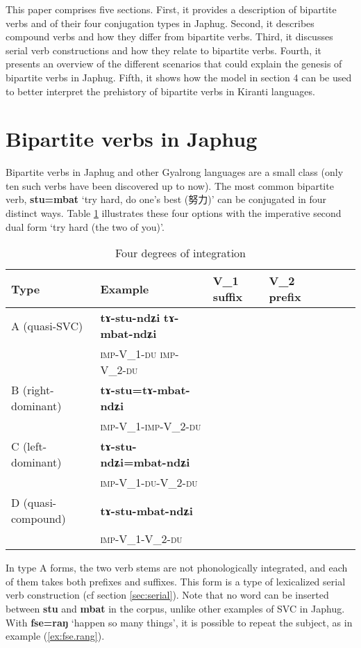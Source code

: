 \documentclass[11pt]{article}
\newcommand{\ipa}[1]{{\phon\textbf{#1}}}
\newcommand{\zh}[1]{{\cn #1}}
\newcommand{\Y}{\Checkmark}
\newcommand{\N}{}
\newcommand{\jpg}[2]{\ipa{#1} `#2'}
\newcommand{\refb}[1]{(\ref{#1})}
\begin{document}
This paper comprises five sections. First, it provides a description of bipartite verbs and of their four conjugation types in Japhug. Second, it describes compound verbs and how they differ from bipartite verbs. Third, it discusses serial verb constructions and how they relate to bipartite verbs. Fourth, it presents an overview of the different scenarios that could explain the genesis of bipartite verbs in Japhug. Fifth, it shows how the model in section 4 can be used to better interpret the prehistory of bipartite verbs in Kiranti languages.

\section{Bipartite verbs in Japhug} \label{sec:japhug.bipart}

Bipartite verbs in Japhug and other Gyalrong languages are a small class (only ten such verbs have been discovered up to now). 
The most common bipartite verb, \jpg{stu=mbat}{try hard, do one's best (\zh{努力})} can be conjugated in four distinct ways. Table \ref{tab:four} illustrates these four options with the imperative second dual form `try hard (the two of you)'.


\begin{table}[H]
\caption{Four degrees of integration} \centering \label{tab:four}
\begin{tabular}{lllllll}
\toprule
Type & Example & V_1 suffix & V_2 prefix \\
\midrule
A (quasi-SVC) & \ipa{tɤ-stu-ndʑi} \ipa{tɤ-mbat-ndʑi} &\Y &\Y \\
 &\textsc{imp}-V_1-\textsc{du}  \textsc{imp}-V_2-\textsc{du} \\
B (right-dominant) & \ipa{tɤ-stu=tɤ-mbat-ndʑi} &\N  &\Y \\
 &\textsc{imp}-V_1-\textsc{imp}-V_2-\textsc{du} \\
C (left-dominant) & \ipa{tɤ-stu-ndʑi=mbat-ndʑi} &\Y  &\N \\
 &\textsc{imp}-V_1-\textsc{du}-V_2-\textsc{du} \\
D (quasi-compound)& \ipa{tɤ-stu-mbat-ndʑi} &\N  &\N \\
 &\textsc{imp}-V_1-V_2-\textsc{du} \\
\bottomrule
\end{tabular}
\end{table}

In type A forms, the two verb stems are not phonologically integrated, and each of them takes both prefixes and suffixes. This form is a type of lexicalized serial verb construction (cf section \ref{sec:serial}). Note that  no word  can be inserted between \ipa{stu} and \ipa{mbat} in the corpus, unlike other examples of SVC in Japhug. With \jpg{fse=raŋ}{happen so many things}, it is possible to repeat the subject, as in example \refb{ex:fse.rang}.
\end{document}
